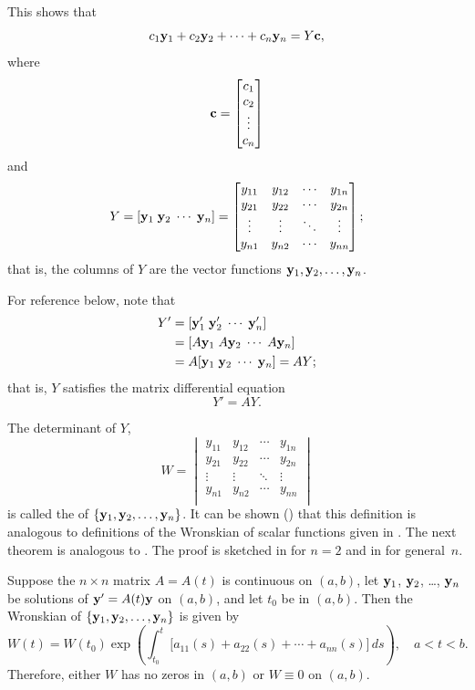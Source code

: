 This shows that
\begin{equation} \label{eq:10.3.3}
c_1\mathbf{y}_1+c_2\mathbf{y}_2+\cdots+c_n\mathbf{y}_n=Y\mathbf{c},
\end{equation}
where
\[
\mathbf{c}=\begin{bmatrix}c_1\\c_2\\\vdots\\c_n\end{bmatrix}
\]
and
\begin{equation} \label{eq:10.3.4}
Y=[\mathbf{y}_1\; \mathbf{y}_2\; \cdots\; \mathbf{y}_n]=
\begin{bmatrix}
y_{11}&y_{12}&\cdots&y_{1n} \\
y_{21}&y_{22}&\cdots&y_{2n}\\
\vdots&\vdots&\ddots&\vdots \\
y_{n1}&y_{n2}&\cdots&y_{nn} \\
\end{bmatrix};
\end{equation}
 that is, the columns of $Y$
are the vector functions $\mathbf{y}_1,\mathbf{y}_2,\dots,\mathbf{y}_n$.

For reference below, note that
\begin{align*}
Y'&=[\mathbf{y}_1'\; \mathbf{y}_2'\; \cdots\; \mathbf{y}_n']\\
&=[A\mathbf{y}_1\; A\mathbf{y}_2\; \cdots\; A\mathbf{y}_n]\\
&=A[\mathbf{y}_1\; \mathbf{y}_2\; \cdots\; \mathbf{y}_n]=AY;
\end{align*}
that is, $Y$ satisfies the matrix differential equation
\[
Y'=AY.
\]

The determinant of $Y$,
\begin{equation} \label{eq:10.3.5}
W=\begin{vmatrix}
y_{11}&y_{12}&\cdots&y_{1n} \\
y_{21}&y_{22}&\cdots&y_{2n}\\
\vdots&\vdots&\ddots&\vdots \\
y_{n1}&y_{n2}&\cdots&y_{nn} \\
\end{vmatrix}
\end{equation}
is called the
of $\{\mathbf{y}_1,\mathbf{y}_2,\dots,\mathbf{y}_n\}$. It can be shown ()
that this definition is analogous to definitions of the Wronskian of
scalar functions given in .
The next theorem is analogous to
. The proof is sketched in
 for
$n=2$ and in  for general~$n$.

\begin{theorem}\label{thmtype:10.3.2}
Suppose the $n\times n$ matrix $A=A(t)$ is continuous on $(a,b)$, let
$\mathbf{y}_1$, $\mathbf{y}_2$, \dots, $\mathbf{y}_n$ be solutions of $\mathbf{y}'=A(t)\mathbf{y}$ on $(a,b)$, and let $t_0$ be in $(a,b)$. Then the
Wronskian of $\{\mathbf{y}_1,\mathbf{y}_2,\dots,\mathbf{y}_n\}$ is given by
\begin{equation} \label{eq:10.3.6}
W(t)=W(t_0)\exp\left(
\int^t_{t_0}\big[a_{11}(s)+a_{22}(s)+\cdots+a_{nn}(s)]\,
ds\right), \quad  a < t < b.
\end{equation}
Therefore,  either $W$ has no zeros in  $(a,b)$ or $W\equiv0$
on  $(a,b)$.
\end{theorem}


